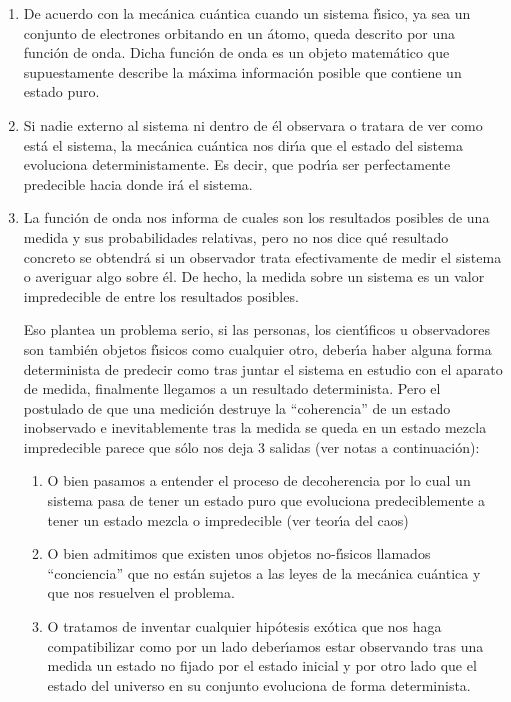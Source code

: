 \begin{enumerate}
\item  De acuerdo con la mec\'{a}nica cu\'{a}ntica cuando un sistema f\'{\i}sico, ya sea un conjunto de electrones orbitando en un \'{a}tomo, queda descrito por una funci\'{o}n de onda. Dicha funci\'{o}n de onda es un objeto matem\'{a}tico que supuestamente describe la m\'{a}xima informaci\'{o}n posible que contiene un estado puro.
\item  Si nadie externo al sistema ni dentro de \'{e}l observara o tratara de ver como est\'{a} el sistema, la mec\'{a}nica cu\'{a}ntica nos dir\'{\i}a que el estado del sistema evoluciona deterministamente. Es decir, que podr\'{\i}a ser perfectamente predecible hacia donde ir\'{a} el sistema.
\item  La funci\'{o}n de onda nos informa de cuales son los resultados posibles de una medida y sus probabilidades relativas, pero no nos dice qu\'{e} resultado concreto se obtendr\'{a} si un observador trata efectivamente de medir el sistema o averiguar algo sobre \'{e}l. De hecho, la medida sobre un sistema es un valor impredecible de entre los resultados posibles.

Eso plantea un problema serio, si las personas, los cient\'{\i}ficos u observadores son tambi\'{e}n objetos f\'{\i}sicos como cualquier otro, deber\'{\i}a haber alguna forma determinista de predecir como tras juntar el sistema en estudio con el aparato de medida, finalmente llegamos a un resultado determinista. Pero el postulado de que una medici\'{o}n destruye la ``coherencia'' de un estado inobservado e inevitablemente tras la medida se queda en un estado mezcla impredecible parece que s\'{o}lo nos deja 3 salidas (ver notas a continuaci\'{o}n):
\begin{enumerate}
\item O bien pasamos a entender el proceso de decoherencia por lo cual un sistema pasa de tener un estado puro que evoluciona predeciblemente a tener un estado mezcla o impredecible (ver teor\'{\i}a del caos)
\item  O bien admitimos que existen unos objetos no-f\'{\i}sicos llamados ``conciencia'' que no est\'{a}n sujetos a las leyes de la mec\'{a}nica cu\'{a}ntica y que nos resuelven el problema.
\item  O tratamos de inventar cualquier hip\'{o}tesis ex\'{o}tica que nos haga compatibilizar como por un lado deber\'{\i}amos estar observando tras una medida un estado no fijado por el estado inicial y por otro lado que el estado del universo en su conjunto evoluciona de forma determinista.
\end{enumerate}


\end{enumerate}
